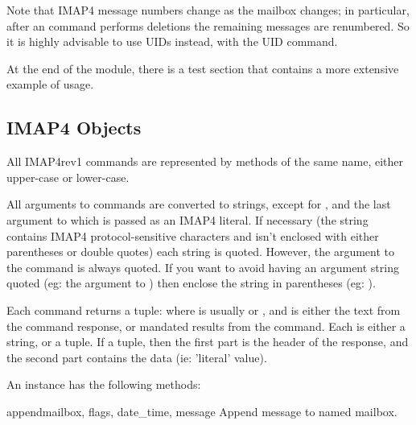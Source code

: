 Note that IMAP4 message numbers change as the mailbox changes; in
particular, after an  command performs deletions the
remaining messages are renumbered. So it is highly advisable to use
UIDs instead, with the UID command.

At the end of the module, there is a test section that contains a more
extensive example of usage.

\begin{seealso}
\end{seealso}


\subsection{IMAP4 Objects \label{imap4-objects}}

All IMAP4rev1 commands are represented by methods of the same name,
either upper-case or lower-case.

All arguments to commands are converted to strings, except for
, and the last argument to  which is
passed as an IMAP4 literal.  If necessary (the string contains IMAP4
protocol-sensitive characters and isn't enclosed with either
parentheses or double quotes) each string is quoted. However, the
 argument to the  command is always quoted.
If you want to avoid having an argument string quoted
(eg: the  argument to ) then enclose the string in
parentheses (eg: ).

Each command returns a tuple:  where  is usually  or ,
and  is either the text from the command response, or
mandated results from the command. Each 
is either a string, or a tuple. If a tuple, then the first part
is the header of the response, and the second part contains
the data (ie: 'literal' value).

An  instance has the following methods:


\begin{methoddesc}{append}{mailbox, flags, date_time, message}
  Append message to named mailbox. 
\end{methoddesc}

